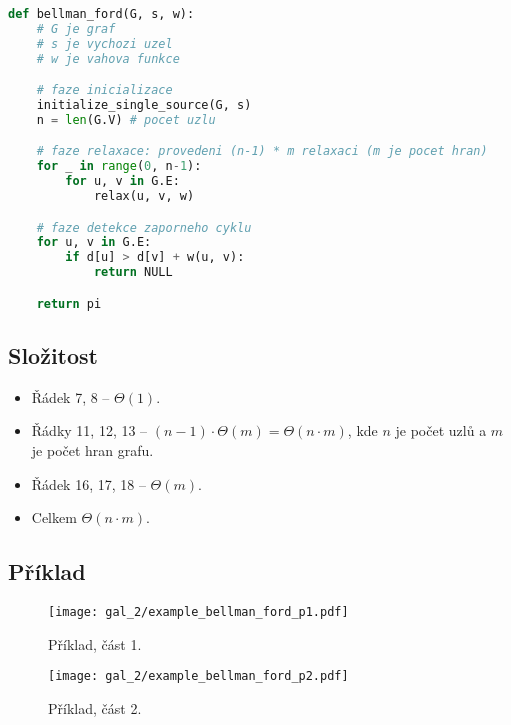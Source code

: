 \bigskip\noindent\begin{minipage}{\linewidth}
\begin{lstlisting}[language=Python, caption={Algoritmus Bellman-Ford. Proč $n-1$ iterací? Protože mezi libovolnými dvěma uzly v grafu, existuje cesta o maximálním počtu hran $n-1$.}]
def bellman_ford(G, s, w):
    # G je graf
    # s je vychozi uzel
    # w je vahova funkce

    # faze inicializace
    initialize_single_source(G, s)
    n = len(G.V) # pocet uzlu

    # faze relaxace: provedeni (n-1) * m relaxaci (m je pocet hran)
    for _ in range(0, n-1):
        for u, v in G.E:
            relax(u, v, w)

    # faze detekce zaporneho cyklu
    for u, v in G.E:
        if d[u] > d[v] + w(u, v):
            return NULL

    return pi
\end{lstlisting}
\end{minipage}

\subsection*{Složitost}

\begin{itemize}
    \item Řádek 7, 8 -- $\Theta(1)$.
    \item Řádky 11, 12, 13 -- $(n-1) \cdot \Theta(m) = \Theta(n \cdot m)$, kde $n$ je počet uzlů a $m$ je počet hran grafu.
    \item Řádek 16, 17, 18 -- $\Theta(m)$.
    \item Celkem $\Theta(n \cdot m)$.
\end{itemize}

\subsection*{Příklad}

\begin{figure}[H]
    \centering
    \texttt{[image: gal\_2/example\_bellman\_ford\_p1.pdf]}
    \caption{Příklad, část 1.}
\end{figure}

\begin{figure}[H]
    \centering
    \texttt{[image: gal\_2/example\_bellman\_ford\_p2.pdf]}
    \caption{Příklad, část 2.}
\end{figure}

